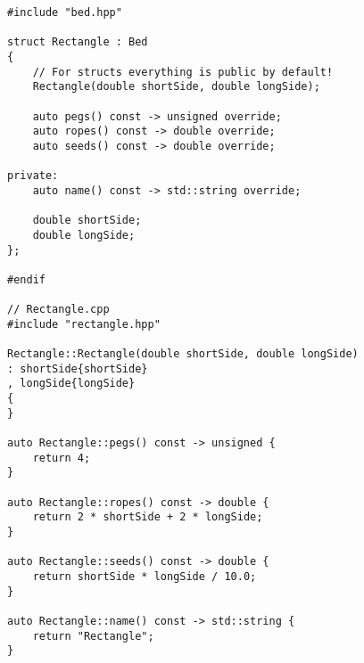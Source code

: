 \begin{multicols*}{3}
\begin{verbatim}
#include "bed.hpp"

struct Rectangle : Bed
{
    // For structs everything is public by default!
    Rectangle(double shortSide, double longSide);

    auto pegs() const -> unsigned override;
    auto ropes() const -> double override;
    auto seeds() const -> double override;

private:
    auto name() const -> std::string override;

    double shortSide;
    double longSide;
};

#endif

// Rectangle.cpp
#include "rectangle.hpp"

Rectangle::Rectangle(double shortSide, double longSide)
: shortSide{shortSide}
, longSide{longSide}
{
}

auto Rectangle::pegs() const -> unsigned {
    return 4;
}

auto Rectangle::ropes() const -> double {
    return 2 * shortSide + 2 * longSide;
}

auto Rectangle::seeds() const -> double {
    return shortSide * longSide / 10.0;
}

auto Rectangle::name() const -> std::string {
    return "Rectangle";
}
\end{verbatim}


\end{multicols*}
